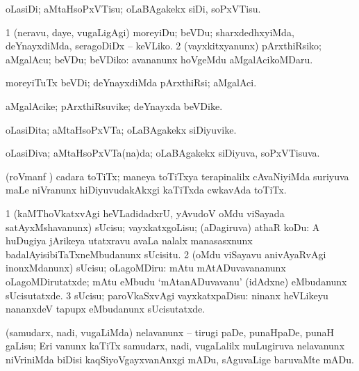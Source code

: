 \noindent
\gl{\akirx}
\bmng
oLasiDi; aMtaHsoPxVTisu; oLaBAgakekx siDi, soPxVTisu. 
\emng
\eentry

\bentry
{}
\gl{\sakirx}
\bmng
\bnum
\num{1} (neravu, daye, \mo vugaLigAgi) moreyiDu; beVDu; sharxdedhxyiMda, deYnayxdiMda, seragoDiDx -- keVLiko. 
\num{2} (vayxkitxyanunx) pArxthiRsiko; aMgalAcu; beVDu; beVDiko:  avananunx hoVgeMdu aMgalAcikoMDaru. 
\enum
\emng
\eentry

\bentry
{}
\gl{\kirxvi}
\bmng
moreyiTuTx beVDi; deYnayxdiMda pArxthiRsi; aMgalAci. 
\emng
\eentry

\bentry
{}
\gl{\nA}
\bmng
aMgalAcike; pArxthiRsuvike; deYnayxda beVDike. 
\emng
\eentry

\bentry
{}
\gl{\nA}
\bmng
oLasiDita; aMtaHsoPxVTa; oLaBAgakekx siDiyuvike. 
\emng
\eentry

\bentry
{}
\gl{\gu}
\bmng
oLasiDiva; aMtaHsoPxVTa(na)da; oLaBAgakekx siDiyuva, soPxVTisuva. 
\emng
\eentry

\bentry
{}
\gl{\nA}
\expl{\Latin }
\bmng
(roVmanf \pArxkatx) cadara toTiTx; maneya toTiTxya terapinalilx cAvaNiyiMda suriyuva maLe niVranunx hiDiyuvudakAkxgi kaTiTxda cwkavAda toTiTx. 
\emng
\eentry

\bentry
{}
\gl{\sakirx}
\bmng
\bnum
\num{1} (kaMThoVkatxvAgi heVLadidadxrU, yAvudoV oMdu viSayada satAyxMshavanunx) sUcisu; vayxkatxgoLisu; (aDagiruva) athaR koDu:  A huDugiya jArikeya utatxravu avaLa nalalx manasasxnunx badalAyisibiTaTxneMbudanunx sUcisitu. 
\num{2} (oMdu viSayavu anivAyaRvAgi inonxMdanunx) sUcisu; oLagoMDiru:  mAtu mAtADuvavananunx oLagoMDirutatxde; mAtu eMbudu `mAtanADuvavanu' (idAdxne) eMbudanunx sUcisutatxde. 
\num{3} sUcisu; paroVkaSxvAgi vayxkatxpaDisu:  ninanx heVLikeyu nananxdeV tapupx eMbudanunx sUcisutatxde. 
\enum
\emng
\eentry

\bentry
{}
\gl{\sakirx}
\bmng
(samudarx, nadi, \mo vugaLiMda) nelavanunx -- tirugi paDe, punaHpaDe, punaH gaLisu; Eri \mo vanunx kaTiTx samudarx, nadi, \mo vugaLalilx muLugiruva nelavanunx niVriniMda biDisi kaqSiyoVgayxvanAnxgi mADu, sAguvaLige baruvaMte mADu. 
\emng
\eentry

